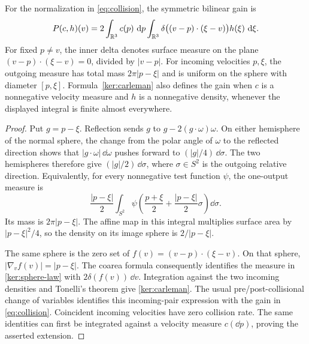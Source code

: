 \begin{lemma}\label{lem:carleman}
For the normalization in \eqref{eq:collision}, the symmetric bilinear
gain is
\begin{equation}\label{ker:carleman}
 P(c,h)(v)
 =2\int_{\mathbb R^3}c(p)\,\,\mathrm d p
       \int_{\mathbb R^3}
       \delta\bigl((v-p)\cdot(\xi-v)\bigr)h(\xi)\,\,\mathrm d\xi.
\end{equation}
For fixed $p\ne v$, the inner delta denotes surface measure on the
plane $(v-p)\cdot(\xi-v)=0$, divided by $|v-p|$.
For incoming velocities $p,\xi$, the outgoing measure has total mass
$2\pi|p-\xi|$ and is uniform on the sphere with diameter $[p,\xi]$.
Formula~\eqref{ker:carleman} also defines the gain when $c$ is a
nonnegative velocity measure and $h$ is a nonnegative density, whenever
the displayed integral is finite almost everywhere.
\end{lemma}

\begin{proof}
Put $g=p-\xi$. Reflection sends $g$ to
$g-2(g\cdot\omega)\omega$. On either hemisphere of the normal sphere,
the change from the polar angle of $\omega$ to the reflected direction
shows that $|g\cdot\omega|\,\dd\omega$ pushes forward to
$(|g|/4)\,\dd\sigma$. The two hemispheres therefore give
$(|g|/2)\,\dd\sigma$, where $\sigma\in S^2$ is the outgoing relative
direction. Equivalently, for every nonnegative test function $\psi$,
the one-output measure is
\begin{equation}\label{ker:sphere-law}
 \frac{|p-\xi|}{2}\int_{S^2}
 \psi\left(\frac{p+\xi}{2}
                 +\frac{|p-\xi|}{2}\sigma\right)\dd\sigma.
\end{equation}
Its mass is $2\pi|p-\xi|$. The affine map in this integral multiplies
surface area by $|p-\xi|^2/4$, so the density on its image sphere is
$2/|p-\xi|$.

The same sphere is the zero set of
$f(v)=(v-p)\cdot(\xi-v)$. On that sphere,
$|\nabla_v f(v)|=|p-\xi|$. The coarea formula consequently identifies
the measure in \eqref{ker:sphere-law} with $2\delta(f(v))\,\dd v$.
Integration against the two incoming densities and Tonelli's theorem
give \eqref{ker:carleman}. The usual pre/post-collisional change of
variables identifies this incoming-pair expression with the gain in
\eqref{eq:collision}. Coincident incoming velocities have zero
collision rate. The same identities can first be integrated against a
velocity measure $c(\dd p)$, proving the asserted extension.
\end{proof}

